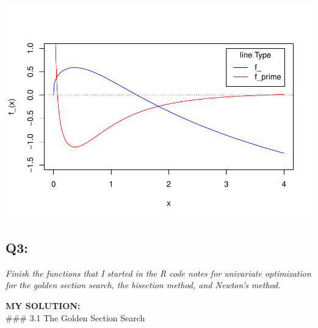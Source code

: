 \documentclass[
]{article}
\begin{document}
\includegraphics{Homework_05_Pan-Lei_files/figure-latex/unnamed-chunk-2-1.pdf}

\hypertarget{q3}{%
\subsection{Q3:}\label{q3}}

\emph{Finish the functions that I started in the R code notes for
univariate optimization for the golden section search, the bisection
method, and Newton's method.}

\textbf{MY SOLUTION:}\\
\#\#\# 3.1 The Golden Section Search
\end{document}
